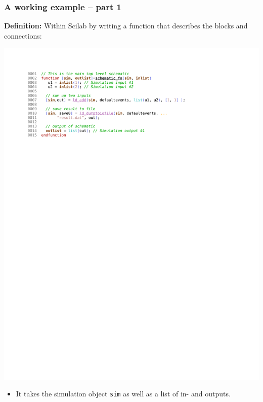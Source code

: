 \documentclass[serif,9pt,xcolor=dvipsnames]{beamer}
\begin{document}
\begin{frame}[fragile]
  \frametitle{A working example -- part 1}

\textbf{Definition:} Within Scilab by writing a function that describes the blocks and connections:

\centering \includegraphics[trim=3cm 20cm 4cm 1.4cm, clip, width=0.85\linewidth]{figures/schematic_fn.pdf} 



\begin{itemize}
 \item It takes the simulation object \texttt{sim} as well as a list of in- and  outputs.
\end{itemize}


\end{frame}
\end{document}
